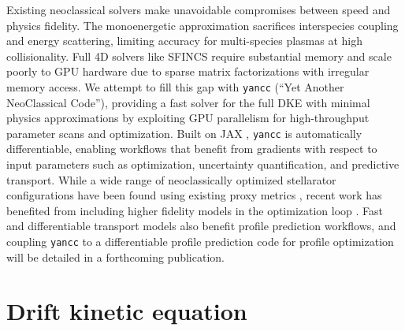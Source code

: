 \documentclass[11pt]{article}
\newcommand{\yancc}{\texttt{yancc}}
\begin{document}
Existing neoclassical solvers make unavoidable compromises between speed and
physics fidelity. The monoenergetic approximation sacrifices interspecies
coupling and energy scattering, limiting accuracy for multi-species plasmas at
high collisionality. Full 4D solvers like SFINCS require substantial memory and
scale poorly to GPU hardware due to sparse matrix factorizations with irregular
memory access. We attempt to fill this gap with \yancc{} (``Yet Another
NeoClassical Code''), providing a fast solver for the full DKE with minimal
physics approximations by exploiting GPU parallelism for high-throughput
parameter scans and optimization. Built on JAX \cite{jax2018github}, \yancc{} is
automatically differentiable, enabling workflows that benefit from gradients with
respect to input parameters such as optimization, uncertainty quantification, and
predictive transport. While a wide range of neoclassically optimized stellarator
configurations have been found using existing proxy metrics \cite{landreman2022magnetic,
zarnstorff2001physics,goodman2023constructing,swanson2026overview, lion2025stellaris,
hegna2025infinity, nuhrenberg1986stable, anderson1995helically}, recent work has
benefited from including higher fidelity models in the optimization loop
\cite{neto2025electron,lee2024direct,bindel2023direct,landreman2026bayesian}. Fast
and differentiable transport models also benefit profile prediction workflows, and
coupling \yancc{} to a differentiable profile prediction code for profile optimization will
be detailed in a forthcoming publication.

\section{Drift kinetic equation}
\label{sec:dke}
\end{document}
